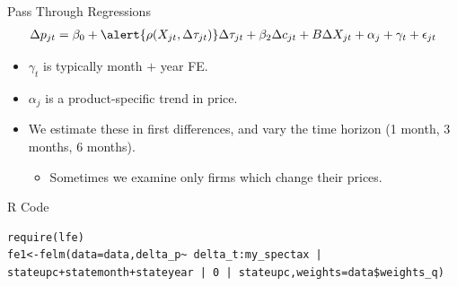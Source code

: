 \begin{frame}{Pass Through Regressions}
\begin{eqnarray*}
\Delta p_{jt} =  \beta_0 + \alert{\rho(X_{jt}, \Delta \tau_{jt}) } \Delta \tau_{jt} + \beta_2 \Delta c_{jt} + B\Delta X_{jt} + \alpha_j + \gamma_t + \epsilon_{jt}
\end{eqnarray*}
\begin{itemize}
\item $\gamma_t$ is typically month $+$ year FE.
\item $\alpha_j$ is a product-specific trend in price.
\item We estimate these in first differences, and vary the time horizon (1 month, 3 months, 6 months).
\begin{itemize}
\item Sometimes we  examine only firms which change their prices.
\end{itemize}
\end{itemize}
\end{frame}

\begin{frame}[fragile]{R Code}
\begin{verbatim}
require(lfe)
fe1<-felm(data=data,delta_p~ delta_t:my_spectax | stateupc+statemonth+stateyear | 0 | stateupc,weights=data$weights_q)
\end{verbatim}
\end{frame}


